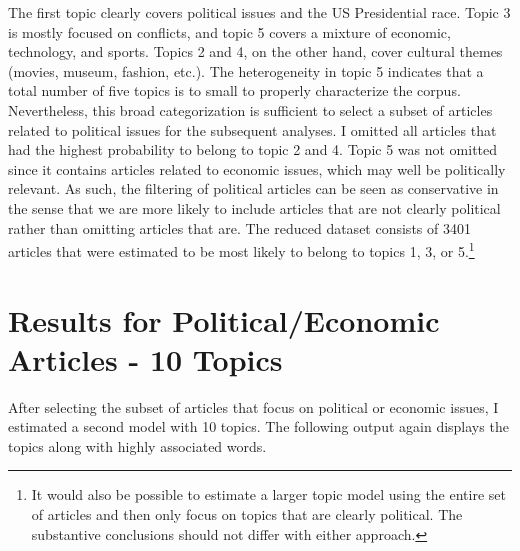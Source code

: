 \documentclass[12pt]{article}\usepackage[]{graphicx}\usepackage[]{color}
\begin{document}
The first topic clearly covers political issues and the US Presidential race. Topic 3 is mostly focused on conflicts, and topic 5 covers a mixture of economic, technology, and sports. Topics 2 and 4, on the other hand, cover cultural themes (movies, museum, fashion, etc.). The heterogeneity in topic 5 indicates that a total number of five topics is to small to properly characterize the corpus. Nevertheless, this broad categorization is sufficient to select a subset of articles related to political issues for the subsequent analyses. I omitted all articles that had the highest probability to belong to topic 2 and 4. Topic 5 was not omitted since it contains articles related to economic issues, which may well be politically relevant. As such, the filtering of political articles can be seen as conservative in the sense that we are more likely to include articles that are not clearly political rather than omitting articles that are. The reduced dataset consists of 3401 articles that were estimated to be most likely to belong to topics 1, 3, or 5.\footnote{It would also be possible to estimate a larger topic model using the entire set of articles and then only focus on topics that are clearly political. The substantive conclusions should not differ with either approach.}


\section{Results for Political/Economic Articles - 10 Topics}

After selecting the subset of articles that focus on political or economic issues, I estimated a second model with 10 topics. The following output again displays the topics along with highly associated words.
\end{document}
